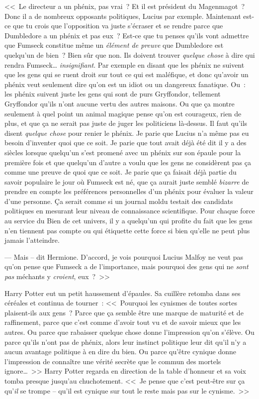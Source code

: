 <<~Le directeur a un phénix, pas vrai~? Et il est président du Magenmagot~? Donc il a de nombreux opposants politiques, Lucius par exemple. Maintenant est-ce que tu crois que l'opposition va juste s'écraser et se rendre parce que Dumbledore a un phénix et pas eux~? Est-ce que tu penses qu'ils vont admettre que Fumseck constitue même un \emph{élément de preuve} que Dumbledore est quelqu'un de bien~? Bien sûr que non. Ils doivent trouver \emph{quelque chose} à dire qui rendra Fumseck… \emph{insignifiant}. Par exemple en disant que les phénix ne suivent que les gens qui se ruent droit sur tout ce qui est maléfique, et donc qu'avoir un phénix veut seulement dire qu'on est un idiot ou un dangereux fanatique. Ou~: les phénix suivent juste les gens qui sont de purs Gryffondor, tellement Gryffondor qu'ils n'ont aucune vertu des autres maisons. Ou que ça montre seulement à quel point un animal magique pense qu'on est courageux, rien de plus, et que ça ne serait pas juste de juger les politiciens là-dessus. Il faut qu'ils disent \emph{quelque chose} pour renier le phénix. Je parie que Lucius n'a même pas eu besoin d'inventer quoi que ce soit. Je parie que tout avait déjà été dit il y a des siècles lorsque quelqu'un s'est promené avec un phénix sur son épaule pour la première fois et que quelqu'un d'autre a voulu que les gens ne considèrent pas ça comme une preuve de quoi que ce soit. Je parie que ça faisait déjà partie du savoir populaire le jour où Fumseck est né, que ça aurait juste semblé \emph{bizarre} de prendre en compte les préférences personnelles d'un phénix pour évaluer la valeur d'une personne. Ça serait comme si un journal moldu testait des candidats politiques en mesurant leur niveau de connaissance scientifique. Pour chaque force au service du Bien de cet univers, il y a quelqu'un qui profite du fait que les gens n'en tiennent pas compte ou qui étiquette cette force si bien qu'elle ne peut plus jamais l'atteindre.

--- Mais -- dit Hermione. D'accord, je vois pourquoi Lucius Malfoy ne veut pas qu'on pense que Fumseck a de l'importance, mais pourquoi des gens qui ne \emph{sont pas} méchants y \emph{croient}, eux~?~>>

Harry Potter eut un petit haussement d'épaules. Sa cuillère retomba dans ses céréales et continua de tourner~: <<~Pourquoi les cynismes de toutes sortes plaisent-ils aux gens~? Parce que ça semble être une marque de maturité et de raffinement, parce que c'est comme d'avoir tout vu et de savoir mieux que les autres. Ou parce que rabaisser quelque chose donne l'impression qu'on s'élève. Ou parce qu'ils n'ont pas de phénix, alors leur instinct politique leur dit qu'il n'y a aucun avantage politique à en dire du bien. Ou parce qu'être cynique donne l'impression de connaître une vérité secrète que le commun des mortels ignore…~>> Harry Potter regarda en direction de la table d'honneur et sa voix tomba presque jusqu'au chuchotement. <<~Je pense que c'est peut-être sur ça qu'\emph{il} se trompe -- qu'il est cynique sur tout le reste mais pas sur le cynisme.~>>

